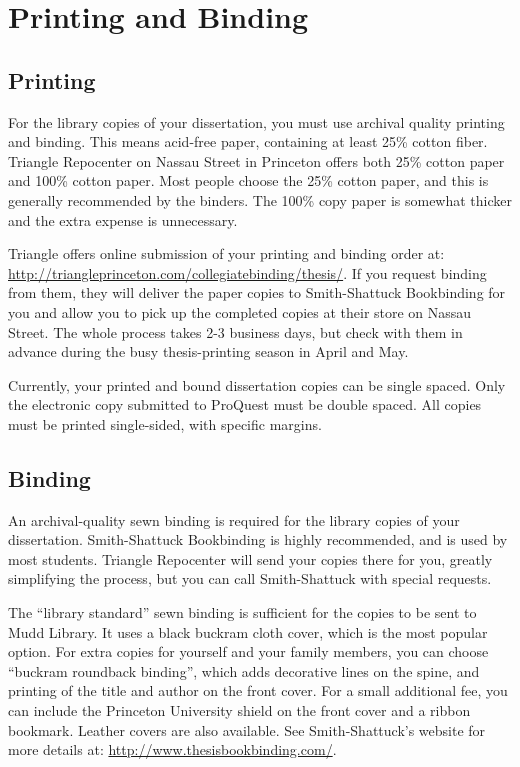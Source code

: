 \chapter{Printing and Binding\label{ch:printing}}

\section{Printing}

For the library copies of your dissertation, you must use archival quality printing and binding. This means acid-free paper, containing at least 25\% cotton fiber. Triangle Repocenter on Nassau Street in Princeton offers both 25\% cotton paper and 100\% cotton paper. Most people choose the 25\% cotton paper, and this is generally recommended by the binders. The 100\% copy paper is somewhat thicker and the extra expense is unnecessary.

Triangle offers online submission of your printing and binding order at: \url{http://triangleprinceton.com/collegiatebinding/thesis/}. If you request binding from them, they will deliver the paper copies to Smith-Shattuck Bookbinding for you and allow you to pick up the completed copies at their store on Nassau Street. The whole process takes 2-3 business days, but check with them in advance during the busy thesis-printing season in April and May.

Currently, your printed and bound dissertation copies can be single spaced. Only the electronic copy submitted to ProQuest must be double spaced. All copies must be printed single-sided, with specific margins.

\section{Binding}

An archival-quality sewn binding is required for the library copies of your dissertation. Smith-Shattuck Bookbinding is highly recommended, and is used by most students. Triangle Repocenter will send your copies there for you, greatly simplifying the process, but you can call Smith-Shattuck with special requests.

The ``library standard'' sewn binding is sufficient for the copies to be sent to Mudd Library. It uses a black buckram cloth cover, which is the most popular option. For extra copies for yourself and your family members, you can choose ``buckram roundback binding'', which adds decorative lines on the spine, and printing of the title and author on the front cover. For a small additional fee, you can include the Princeton University shield on the front cover and a ribbon bookmark. Leather covers are also available. See Smith-Shattuck's website for more details at: \url{http://www.thesisbookbinding.com/}.
